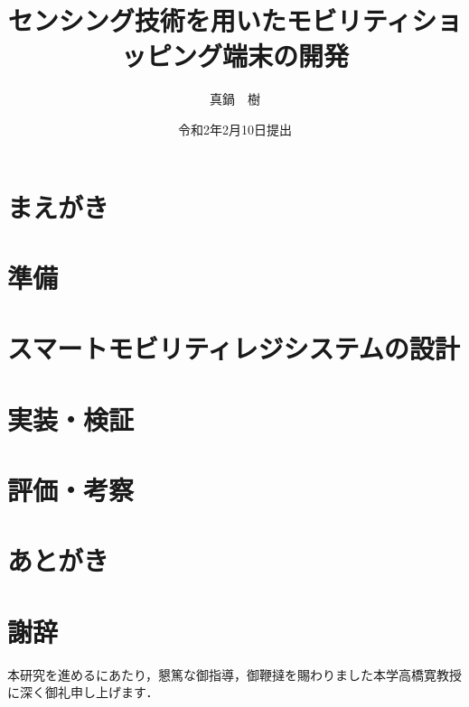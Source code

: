 
\newenvironment{indention}[1]{\par
\addtolength{\leftskip}{#1}
\begingroup}{\endgroup\par}

\title{センシング技術を用いたモビリティショッピング端末の開発}
\author{真鍋　樹}
\date{令和2年2月10日提出}


\maketitle
\tableofcontents
\cleardoublepage
{}

\chapter{まえがき}


\chapter{準備}


\chapter{スマートモビリティレジシステムの設計}






\chapter{実装・検証}




\chapter{評価・考察}

%
%

\chapter{あとがき}



\newpage
{}
\chapter*{謝辞}
本研究を進めるにあたり，懇篤な御指導，御鞭撻を賜わりました本学高橋寛教授に深く御礼申し上げます．

